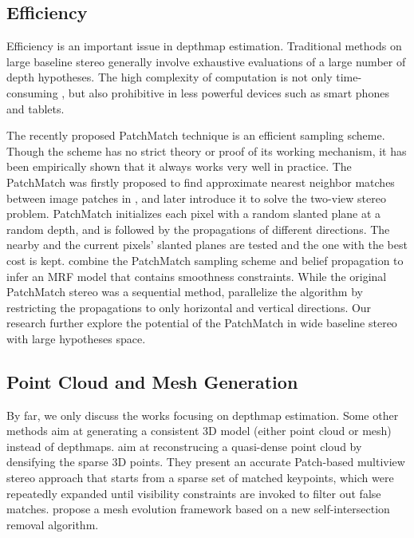 \subsection{Efficiency}
Efficiency is an important issue in depthmap estimation. Traditional methods on large baseline stereo generally involve exhaustive evaluations of a large number of depth hypotheses. The high complexity of computation is not only time-consuming \cite{yang2003multi,CombinedDepthOutlier,Gallup07,LeastCommitment_3DIMPVT2012}, but also prohibitive in less powerful devices such as smart phones and tablets. 

The recently proposed PatchMatch technique is an efficient sampling scheme. Though the scheme has no strict theory or proof of its working mechanism, it has been empirically shown that it always works very well in practice. The PatchMatch was firstly proposed to find approximate nearest neighbor matches between image patches in \citet{Barnes:2009:PAR}, and later \citet{patchMatchStereo1} introduce it to solve the two-view stereo problem. PatchMatch initializes each pixel with a random slanted plane at a random depth, and is followed by the propagations of different directions. The nearby and the current pixels' slanted planes are tested and the one with the best cost is kept. \citet{patchMatchStereo2} combine the PatchMatch sampling scheme and belief propagation to infer an MRF model that contains smoothness constraints.
While the original PatchMatch stereo was a sequential method, \citet{patchMatchParallel} parallelize the algorithm by restricting the propagations to only horizontal and vertical directions. Our research further explore the potential of the PatchMatch in wide baseline stereo with large hypotheses space.

\subsection{Point Cloud and Mesh Generation}
By far, we only discuss the works focusing on depthmap estimation. Some other methods aim at generating a consistent 3D model (either point cloud or mesh) instead of depthmaps. 
\citet{FURUKAWA_PAMI2010} aim at reconstrucing a quasi-dense point cloud by densifying the sparse 3D points.
They present an accurate Patch-based multiview stereo approach that starts from a sparse set of matched keypoints, which were repeatedly expanded until visibility constraints are invoked to filter out false matches. 
\citet{Zaharescu_PAMI2011} propose a mesh evolution framework based on a new self-intersection removal algorithm. 

